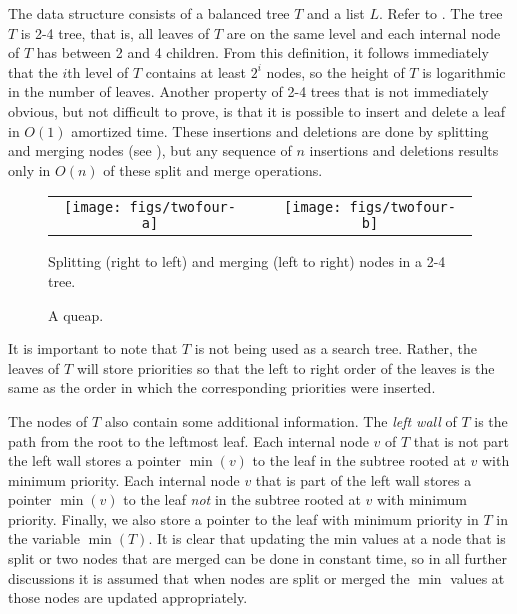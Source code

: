 {The data structure consists of a balanced tree $T$ and a list $L$.
Refer to . The tree $T$ is 2-4 tree, that is, all leaves
of $T$ are on the same level and each internal node of $T$ has between
2 and 4 children.  From this definition, it follows immediately that
the $i$th level of $T$ contains at least $2^i$ nodes, so the height of
$T$ is logarithmic in the number of leaves.  Another property of 2-4
trees that is not immediately obvious, but not difficult to prove, is
that it is possible to insert and delete a leaf in $O(1)$ amortized
time.  These insertions and deletions are done by splitting and
merging nodes (see
), but any sequence of $n$ insertions and deletions
results only in $O(n)$ of these split and merge operations.

\begin{figure}
\begin{center}\begin{tabular}{ccc}
\texttt{[image: figs/twofour-a]} & \raisebox{.6cm}{$\Leftrightarrow$} & \texttt{[image: figs/twofour-b]}
\end{tabular}\end{center}
\caption{Splitting (right to left) and merging (left to right) nodes in a 2-4 tree.}
\end{figure}

\begin{figure}
\caption{A queap.}
\end{figure}

It is important to note that $T$ is not being used as a search tree.
Rather, the leaves of $T$ will store priorities so that the left to
right order of the leaves is the same as the order in which the
corresponding priorities were inserted.

The nodes of $T$ also contain some additional information.  The
\emph{left wall} of $T$ is the path from the root to the leftmost leaf.
Each internal node $v$ of $T$ that is not part the left wall stores a
pointer $\min(v)$ to the leaf in the subtree rooted at $v$ with
minimum priority.  Each internal node $v$ that is part of the left
wall stores a pointer $\min(v)$ to the leaf \emph{not} in the subtree
rooted at $v$ with minimum priority.  Finally, we also store a pointer
to the leaf with minimum priority in $T$ in the variable $\min(T)$.
It is clear that updating the min values at a node that is split or
two nodes that are merged can be done in constant time, so in all
further discussions it is assumed that when nodes are split or merged
the $\min$ values at those nodes are updated appropriately.

}
